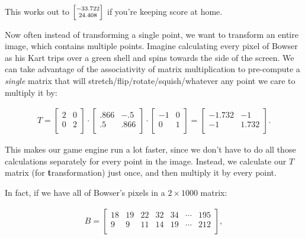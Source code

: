 This works out to ${\scriptsize \begin{bmatrix} -33.722 \\ 24.408 \\
\end{bmatrix}}$ if you're keeping score at home.


Now often instead of transforming a single point, we want to transform an
entire image, which contains multiple points. Imagine calculating every pixel
of Bowser as his Kart trips over a green shell and spins towards the side of
the screen. We can take advantage of the associativity of matrix multiplication
to pre-compute a \textit{single} matrix that will
stretch/flip/rotate/squish/whatever any point we care to multiply it by:

\vspace{-.15in}
\begin{align*}
T = 
\begin{bmatrix}
2 & 0 \\
0 & 2 \\
\end{bmatrix} \cdot
\begin{bmatrix}
.866 & -.5 \\
.5 & .866 \\
\end{bmatrix} \cdot
\begin{bmatrix}
-1 & 0 \\
0 & 1 \\
\end{bmatrix} =
\begin{bmatrix}
-1.732 & -1 \\
-1 & 1.732 \\
\end{bmatrix}.
\end{align*}
\vspace{-.15in}

This makes our game engine run a lot faster, since we don't have to do all
those calculations separately for every point in the image. Instead, we
calculate our $T$ matrix (for \textbf{t}ransformation) just once, and then
multiply it by every point.

In fact, if we have all of Bowser's pixels in a $2\times 1000$ matrix:

\vspace{-.15in}
\begin{align*}
B =
\begin{bmatrix}
18 & 19 & 22 & 32 & 34 & \cdots & 195 \\
9 & 9 & 11 & 14 & 19 & \cdots & 212 \\
\end{bmatrix},
\end{align*}
\vspace{-.15in}

